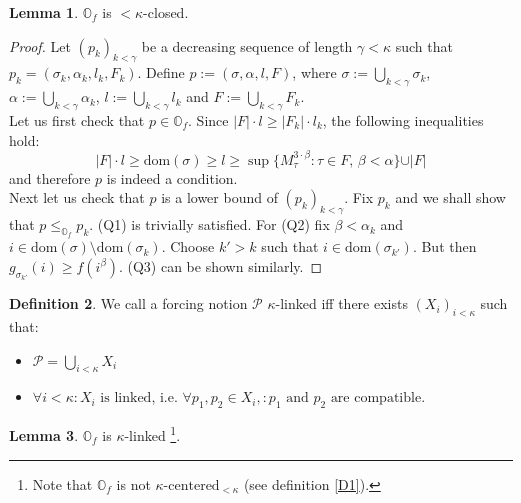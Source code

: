 \documentclass[12pt,a4paper]{scrartcl}
\theoremstyle{definition}
\newtheorem{definition}{Definition}[section]
\newtheorem{lemma}[definition]{Lemma}
\numberwithin{equation}{section}
\begin{document}
\begin{lemma}
$\mathbb{O}_f$ is ${<}\kappa$-closed.
\end{lemma}

\begin{proof}
Let $(p_k)_{k< \gamma}$ be a decreasing sequence of length $\gamma < \kappa$ such that $p_k=(\sigma_k, \alpha_k, l_k, F_k)$. Define $p:=(\sigma, \alpha, l, F)$, where $\sigma:=\bigcup_{k < \gamma} \sigma_k$, $\alpha:=\bigcup_{k < \gamma} \alpha_k$, $l:=\bigcup_{k < \gamma} l_k$ and $F:=\bigcup_{k < \gamma} F_k$.\\
Let us first check that $p \in \mathbb{O}_f$. Since $\vert F\vert \cdot l \geq \vert F_k\vert \cdot l_k$, the following inequalities hold:
$$\vert F\vert \cdot l \geq \text{dom}(\sigma) \geq l \geq \sup\{M_\tau^{3 \cdot \beta} \colon \tau \in F, \, \beta < \alpha\} \cup \vert F \vert$$
and therefore $p$ is indeed a condition.\\
Next let us check that $p$ is a lower bound of $(p_k)_{k< \gamma}$. Fix $p_k$ and we shall show that $p \leq_{\mathbb{O}_f} p_k$. (Q1) is trivially satisfied. For (Q2) fix $\beta < \alpha_k$ and $i \in \text{dom}(\sigma) \setminus \text{dom}(\sigma_k)$. Choose $k' > k$ such that $i \in \text{dom}(\sigma_{k'})$. But then $g_{\sigma_{k'}}(i) \geq f(i^\beta)$. (Q3) can be shown similarly.
\end{proof}


\begin{definition}
We call a forcing notion $\mathcal{P}$ $\kappa$-linked iff there exists $(X_i)_{i<\kappa}$ such that:
\begin{itemize}
\item $\mathcal{P}= \bigcup_{i< \kappa} X_i$
\item $\forall i < \kappa \colon X_i \,\, \text{is linked}$, i.e. $\forall p_1 ,p_2 \in  X_i, \colon p_1 \,\, \text{and} \,\, p_2 \,\, \text{are compatible}$.
\end{itemize}
\end{definition}

\begin{lemma} \label{L4}
$\mathbb{O}_f$ is $\kappa$-linked \footnote{Note that $\mathbb{O}_f$ is not $\kappa\text{-centered}_{<\kappa}$ (see definition \ref{D1}).}.
\end{lemma}
\end{document}
